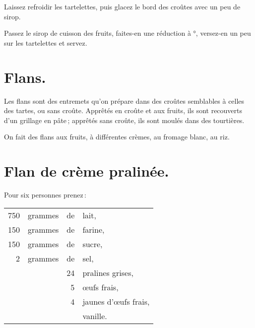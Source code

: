 Laissez refroidir les tartelettes, puis glacez le bord des croûtes avec un peu de
sirop.

Passez le sirop de cuisson des fruits, faites-en une réduction à {\mmm}°,
versez-en un peu sur les tartelettes et servez.

\section*{\centering Flans.}
{}

Les flans sont des entremets qu'on prépare dans des croûtes semblables à celles
des tartes, ou sans croûte. Apprêtés en croûte et aux fruits, ils sont
recouverts d'un grillage en pâte ; apprêtés sans croûte, ils sont moulés dans
des tourtières.

On fait des flans aux fruits, à différentes crèmes, au fromage blanc, au riz.

\section*{\centering Flan de crème pralinée.}
{}

Pour six personnes prenez :

\footnotesize
\begin{longtable}{rrrp{16em}}
    750 & grammes & de & lait,                                                                            \\
    150 & grammes & de & farine,                                                                          \\
    150 & grammes & de & sucre,                                                                           \\
      2 & grammes & de & sel,                                                                             \\
        &         & 24 & pralines grises,                                                                 \\
        &         &  5 & œufs frais,                                                                      \\
        &         &  4 & jaunes d'œufs frais,                                                             \\
        &         &    & vanille.                                                                         \\
\end{longtable}
\normalsize

